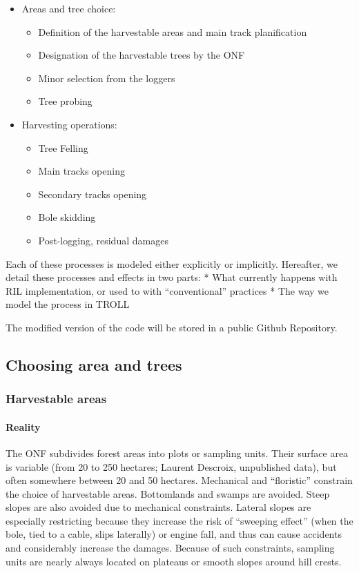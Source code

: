 \documentclass[12pt,]{article}
\providecommand{\tightlist}{%
\setlength{\itemsep}{0pt}\setlength{\parskip}{0pt}}
\theoremstyle{definition}
\theoremstyle{definition}
\theoremstyle{definition}
\theoremstyle{remark}
\begin{document}
\begin{itemize}
\tightlist
\item
  Areas and tree choice:

  \begin{itemize}
  \tightlist
  \item
    Definition of the harvestable areas and main track planification
  \item
    Designation of the harvestable trees by the ONF
  \item
    Minor selection from the loggers
  \item
    Tree probing
  \end{itemize}
\item
  Harvesting operations:

  \begin{itemize}
  \tightlist
  \item
    Tree Felling
  \item
    Main tracks opening
  \item
    Secondary tracks opening
  \item
    Bole skidding
  \item
    Post-logging, residual damages
  \end{itemize}
\end{itemize}

Each of these processes is modeled either explicitly or implicitly.
Hereafter, we detail these processes and effects in two parts: * What
currently happens with RIL implementation, or used to with
``conventional'' practices * The way we model the process in TROLL

The modified version of the code will be stored in a public Github
Repository.

\subsection{Choosing area and trees}\label{choosing-area-and-trees}

\subsubsection{Harvestable areas}\label{harvestable-areas}

\paragraph{Reality}\label{reality}

The ONF subdivides forest areas into plots or sampling units. Their
surface area is variable (from 20 to 250 hectares; Laurent Descroix,
unpublished data), but often somewhere between 20 and 50 hectares.
Mechanical and ``floristic'' constrain the choice of harvestable areas.
Bottomlands and swamps are avoided. Steep slopes are also avoided due to
mechanical constraints. Lateral slopes are especially restricting
because they increase the risk of ``sweeping effect'' (when the bole,
tied to a cable, slips laterally) or engine fall, and thus can cause
accidents and considerably increase the damages. Because of such
constraints, sampling units are nearly always located on plateaus or
smooth slopes around hill crests.
\end{document}

